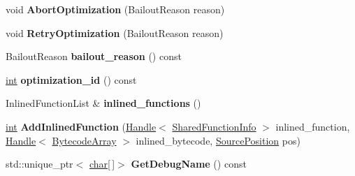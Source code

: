 \begin{DoxyCompactItemize}
\item 
\mbox{\label{classv8_1_1internal_1_1OptimizedCompilationInfo_a4703e91dd1e3a5b5662e1f0fdbdb6664}} 
void {\bfseries Abort\+Optimization} (Bailout\+Reason reason)
\item 
\mbox{\label{classv8_1_1internal_1_1OptimizedCompilationInfo_ac833ab5490860d2940df5859ddb04d10}} 
void {\bfseries Retry\+Optimization} (Bailout\+Reason reason)
\item 
\mbox{\label{classv8_1_1internal_1_1OptimizedCompilationInfo_afdf2578b0ab6015db1d129272d54b4b2}} 
Bailout\+Reason {\bfseries bailout\+\_\+reason} () const
\item 
\mbox{\label{classv8_1_1internal_1_1OptimizedCompilationInfo_a129d3fe3605701e1488ebf0910ca11a4}} 
\mbox{\hyperlink{classint}{int}} {\bfseries optimization\+\_\+id} () const
\item 
\mbox{\label{classv8_1_1internal_1_1OptimizedCompilationInfo_aba4a8246a3d36f51009cd815735df084}} 
Inlined\+Function\+List \& {\bfseries inlined\+\_\+functions} ()
\item 
\mbox{\label{classv8_1_1internal_1_1OptimizedCompilationInfo_a8b63dee0998a00985989a9d0fa39f5e5}} 
\mbox{\hyperlink{classint}{int}} {\bfseries Add\+Inlined\+Function} (\mbox{\hyperlink{classv8_1_1internal_1_1Handle}{Handle}}$<$ \mbox{\hyperlink{classv8_1_1internal_1_1SharedFunctionInfo}{Shared\+Function\+Info}} $>$ inlined\+\_\+function, \mbox{\hyperlink{classv8_1_1internal_1_1Handle}{Handle}}$<$ \mbox{\hyperlink{classv8_1_1internal_1_1BytecodeArray}{Bytecode\+Array}} $>$ inlined\+\_\+bytecode, \mbox{\hyperlink{classv8_1_1internal_1_1SourcePosition}{Source\+Position}} pos)
\item 
\mbox{\label{classv8_1_1internal_1_1OptimizedCompilationInfo_a80298884d7d07af6130b3d794e88208f}} 
std\+::unique\+\_\+ptr$<$ \mbox{\hyperlink{classchar}{char}}\mbox{[}$\,$\mbox{]}$>$ {\bfseries Get\+Debug\+Name} () const

\end{DoxyCompactItemize}
